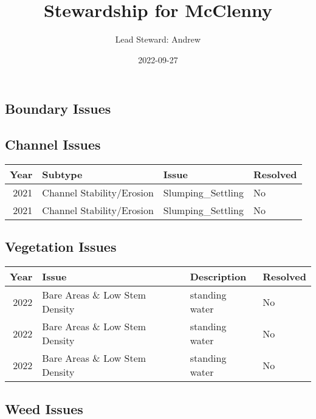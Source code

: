 \documentclass[
  landscape]{article}
\title{Stewardship for McClenny}
\author{Lead Steward: Andrew}
\date{2022-09-27}
\begin{document}
\maketitle

\hypertarget{boundary-issues}{%
\subsection{Boundary Issues}\label{boundary-issues}}

\textbar\textbar{} \textbar\textbar{} \textbar\textbar{}
\textbar\textbar{}

\hypertarget{channel-issues}{%
\subsection{Channel Issues}\label{channel-issues}}

\begin{longtable}[]{@{}rlll@{}}
\toprule()
Year & Subtype & Issue & Resolved \\
\midrule()
\endhead
2021 & Channel Stability/Erosion & Slumping\_Settling & No \\
2021 & Channel Stability/Erosion & Slumping\_Settling & No \\
\bottomrule()
\end{longtable}

\newpage

\hypertarget{vegetation-issues}{%
\subsection{Vegetation Issues}\label{vegetation-issues}}

\begin{longtable}[]{@{}rlll@{}}
\toprule()
Year & Issue & Description & Resolved \\
\midrule()
\endhead
2022 & Bare Areas \& Low Stem Density & standing water & No \\
2022 & Bare Areas \& Low Stem Density & standing water & No \\
2022 & Bare Areas \& Low Stem Density & standing water & No \\
\bottomrule()
\end{longtable}

\newpage

\hypertarget{weed-issues}{%
\subsection{Weed Issues}\label{weed-issues}}
\end{document}
